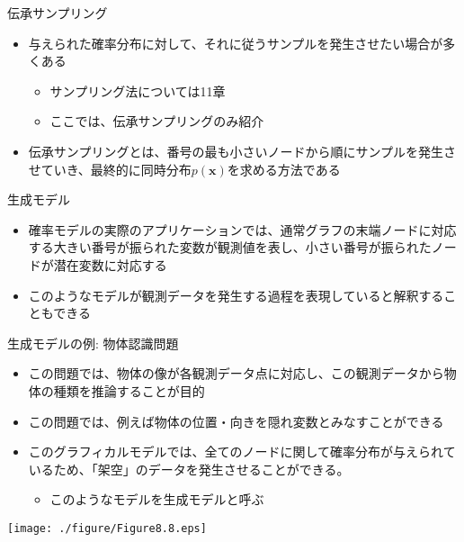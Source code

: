 \begin{frame}{伝承サンプリング}
 \begin{itemize}
  \item 与えられた確率分布に対して、それに従うサンプルを発生させたい場合が多くある
        \begin{itemize}
         \item サンプリング法については11章
         \item ここでは、伝承サンプリングのみ紹介
        \end{itemize}
  \item 伝承サンプリングとは、番号の最も小さいノードから順にサンプルを発生させていき、最終的に同時分布$p(\bm{x})$を求める方法である
 \end{itemize}
\end{frame}

\begin{frame}{生成モデル}
 \begin{itemize}
  \item 確率モデルの実際のアプリケーションでは、通常グラフの末端ノードに対応する大きい番号が振られた変数が観測値を表し、小さい番号が振られたノードが潜在変数に対応する
  \item このようなモデルが観測データを発生する過程を表現していると解釈することもできる
 \end{itemize}
\end{frame}

\begin{frame}{生成モデルの例: 物体認識問題}
 \begin{itemize}
  \item この問題では、物体の像が各観測データ点に対応し、この観測データから物体の種類を推論することが目的
  \item この問題では、例えば物体の位置・向きを隠れ変数とみなすことができる
  \item このグラフィカルモデルでは、全てのノードに関して確率分布が与えられているため、「架空」のデータを発生させることができる。
        \begin{itemize}
         \item このようなモデルを\alert{生成モデル}と呼ぶ
        \end{itemize}
 \end{itemize}
 \begin{center}
  \texttt{[image: ./figure/Figure8.8.eps]}
 \end{center}
\end{frame}
